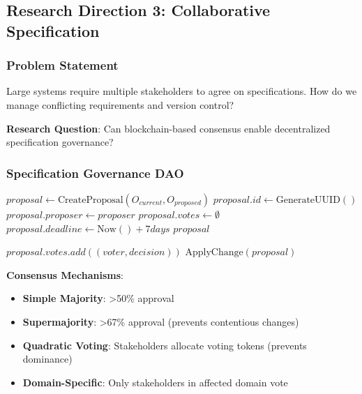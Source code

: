 \subsection{Research Direction 3: Collaborative Specification}

\subsubsection{Problem Statement}

Large systems require multiple stakeholders to agree on specifications. How do we manage conflicting requirements and version control?

\textbf{Research Question}: Can blockchain-based consensus enable decentralized specification governance?

\subsubsection{Specification Governance DAO}

\begin{algorithm}
\caption{DAO-Based Specification Governance}
\begin{algorithmic}[1]
    \State $proposal \gets \text{CreateProposal}(O_{current}, O_{proposed})$
    \State $proposal.id \gets \text{GenerateUUID}()$
    \State $proposal.proposer \gets proposer$
    \State $proposal.votes \gets \emptyset$
    \State $proposal.deadline \gets \text{Now}() + 7 days$
    \State \Return $proposal$
\EndProcedure

        \State $proposal.votes.add((voter, decision))$
            \State $\text{ApplyChange}(proposal)$
        \EndIf
    \EndIf
\EndProcedure
\end{algorithmic}
\end{algorithm}

\textbf{Consensus Mechanisms}:
\begin{itemize}
    \item \textbf{Simple Majority}: >50\% approval
    \item \textbf{Supermajority}: >67\% approval (prevents contentious changes)
    \item \textbf{Quadratic Voting}: Stakeholders allocate voting tokens (prevents dominance)
    \item \textbf{Domain-Specific}: Only stakeholders in affected domain vote
\end{itemize}

